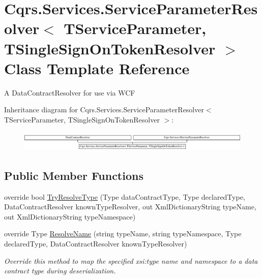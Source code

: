 \hypertarget{classCqrs_1_1Services_1_1ServiceParameterResolver}{}\section{Cqrs.\+Services.\+Service\+Parameter\+Resolver$<$ T\+Service\+Parameter, T\+Single\+Sign\+On\+Token\+Resolver $>$ Class Template Reference}
\label{classCqrs_1_1Services_1_1ServiceParameterResolver}


A Data\+Contract\+Resolver for use via W\+CF  


Inheritance diagram for Cqrs.\+Services.\+Service\+Parameter\+Resolver$<$ T\+Service\+Parameter, T\+Single\+Sign\+On\+Token\+Resolver $>$\+:\begin{figure}[H]
\begin{center}
\leavevmode
\includegraphics[height=0.989399cm]{classCqrs_1_1Services_1_1ServiceParameterResolver}
\end{center}
\end{figure}
\subsection*{Public Member Functions}
\begin{DoxyCompactItemize}
\item 
override bool \hyperlink{classCqrs_1_1Services_1_1ServiceParameterResolver_a22a2d6f220b8d2d3eba59e98dc577b43_a22a2d6f220b8d2d3eba59e98dc577b43}{Try\+Resolve\+Type} (Type data\+Contract\+Type, Type declared\+Type, Data\+Contract\+Resolver known\+Type\+Resolver, out Xml\+Dictionary\+String type\+Name, out Xml\+Dictionary\+String type\+Namespace)
\item 
override Type \hyperlink{classCqrs_1_1Services_1_1ServiceParameterResolver_a1c668ecde242b87faa85a3dc89d5d974_a1c668ecde242b87faa85a3dc89d5d974}{Resolve\+Name} (string type\+Name, string type\+Namespace, Type declared\+Type, Data\+Contract\+Resolver known\+Type\+Resolver)
\begin{DoxyCompactList}\small\item\em Override this method to map the specified xsi\+:type name and namespace to a data contract type during deserialization. \end{DoxyCompactList}\end{DoxyCompactItemize}
